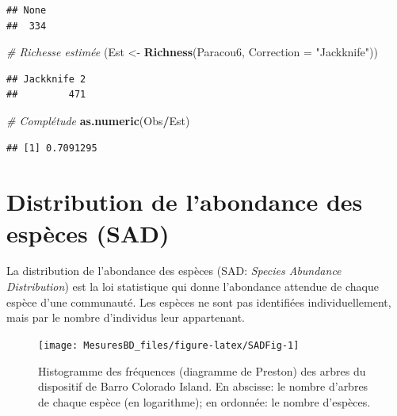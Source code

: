 \documentclass[
  11pt,
  french,
  a4paper,
  extrafontsizes,onecolumn,openright
  ]{memoir}
\newenvironment{Shaded}{\begin{snugshade}}{\end{snugshade}}
\newcommand{\CommentTok}[1]{\textcolor[rgb]{0.56,0.35,0.01}{\textit{#1}}}
\newcommand{\DataTypeTok}[1]{\textcolor[rgb]{0.13,0.29,0.53}{#1}}
\newcommand{\KeywordTok}[1]{\textcolor[rgb]{0.13,0.29,0.53}{\textbf{#1}}}
\newcommand{\NormalTok}[1]{#1}
\newcommand{\OperatorTok}[1]{\textcolor[rgb]{0.81,0.36,0.00}{\textbf{#1}}}
\newcommand{\StringTok}[1]{\textcolor[rgb]{0.31,0.60,0.02}{#1}}
\begin{document}
\begin{verbatim}
## None 
##  334
\end{verbatim}

\begin{Shaded}
\begin{Highlighting}[]
\CommentTok{# Richesse estimée}
\NormalTok{(Est <-}\StringTok{ }\KeywordTok{Richness}\NormalTok{(Paracou6, }\DataTypeTok{Correction =} \StringTok{"Jackknife"}\NormalTok{))}
\end{Highlighting}
\end{Shaded}

\begin{verbatim}
## Jackknife 2 
##         471
\end{verbatim}

\begin{Shaded}
\begin{Highlighting}[]
\CommentTok{# Complétude}
\KeywordTok{as.numeric}\NormalTok{(Obs}\OperatorTok{/}\NormalTok{Est)}
\end{Highlighting}
\end{Shaded}

\begin{verbatim}
## [1] 0.7091295
\end{verbatim}

\normalsize

\hypertarget{distribution-de-labondance-des-espuxe8ces-sad}{%
\section{Distribution de l'abondance des espèces (SAD)}\label{distribution-de-labondance-des-espuxe8ces-sad}}

La distribution de l'abondance des espèces (SAD: \emph{Species Abundance Distribution}) est la loi statistique qui donne l'abondance attendue de chaque espèce d'une communauté.
Les espèces ne sont pas identifiées individuellement, mais par le nombre d'individus leur appartenant.



\scriptsize

\begin{figure}

{\centering \texttt{[image: MesuresBD\_files/figure-latex/SADFig-1]} 

}

\caption{Histogramme des fréquences (diagramme de Preston) des arbres du dispositif de Barro Colorado Island. En abscisse: le nombre d'arbres de chaque espèce (en logarithme); en ordonnée: le nombre d'espèces.}\label{fig:SADFig}
\end{figure}
\end{document}
